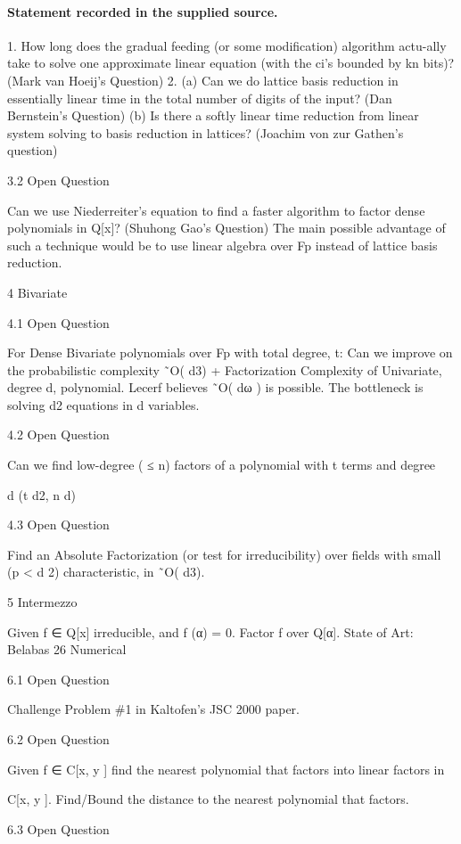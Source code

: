 \documentclass[11pt]{article}
\begin{document}
\paragraph{Statement recorded in the supplied source.}
1. How long does the gradual feeding (or some modification) algorithm actu-ally take to solve one approximate linear equation (with the ci's bounded by kn bits)? (Mark van Hoeij's Question) 2. (a) Can we do lattice basis reduction in essentially linear time in the total number of digits of the input? (Dan Bernstein's Question) (b) Is there a softly linear time reduction from linear system solving to basis reduction in lattices? (Joachim von zur Gathen's question)

3.2 Open Question

Can we use Niederreiter's equation to find a faster algorithm to factor dense polynomials in Q[x]? (Shuhong Gao's Question) The main possible advantage of such a technique would be to use linear algebra over Fp instead of lattice basis reduction.

4 Bivariate

4.1 Open Question

For Dense Bivariate polynomials over Fp with total degree, t: Can we improve on the probabilistic complexity ˜O( d3) + Factorization Complexity of Univariate, degree d, polynomial. Lecerf believes ˜O( dω ) is possible. The bottleneck is solving d2 equations in d variables.

4.2 Open Question

Can we find low-degree ( ≤ n) factors of a polynomial with t terms and degree

d (t
 d2, n
 d)

4.3 Open Question

Find an Absolute Factorization (or test for irreducibility) over fields with small (p < d 2) characteristic, in ˜O( d3).

5 Intermezzo

Given f ∈ Q[x] irreducible, and f (α) = 0. Factor f over Q[α]. State of Art: Belabas 26 Numerical

6.1 Open Question

Challenge Problem \#1 in Kaltofen's JSC 2000 paper.

6.2 Open Question

Given f ∈ C[x, y ] find the nearest polynomial that factors into linear factors in

C[x, y ]. Find/Bound the distance to the nearest polynomial that factors.

6.3 Open Question
\end{document}
